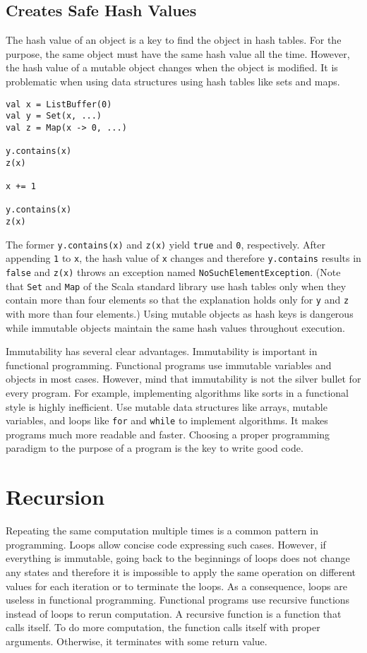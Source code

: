 \subsection{Creates Safe Hash Values}

The hash value of an object is a key to find the object in hash tables. For the
purpose, the same object must have the same hash value all the time. However, the
hash value of a mutable object changes when the object is modified. It is
problematic when using data structures using hash tables like sets and maps.

\begin{verbatim}
val x = ListBuffer(0)
val y = Set(x, ...)
val z = Map(x -> 0, ...)

y.contains(x)
z(x)

x += 1

y.contains(x)
z(x)
\end{verbatim}

The former \verb!y.contains(x)! and \verb!z(x)! yield \verb!true! and \verb!0!,
respectively. After appending \verb!1! to \verb!x!, the hash value of \verb!x!
changes and therefore \verb!y.contains! results in \verb!false! and \verb!z(x)!
throws an exception named \verb!NoSuchElementException!. (Note that \verb!Set!
and \verb!Map! of the Scala standard library use hash tables only when they
contain more than four elements so that the explanation holds only for \verb!y!
and \verb!z! with more than four elements.) Using mutable objects as hash keys is
dangerous while immutable objects maintain the same hash values throughout
execution.

Immutability has several clear advantages. Immutability is important in
functional programming. Functional programs use immutable variables and objects
in most cases. However, mind that immutability is not the silver bullet for every
program. For example, implementing algorithms like sorts in a functional style is
highly inefficient. Use mutable data structures like arrays, mutable variables,
and loops like \verb!for! and \verb!while! to implement algorithms. It makes
programs much more readable and faster. Choosing a proper programming paradigm to
the purpose of a program is the key to write good code.

\section{Recursion}

Repeating the same computation multiple times is a common pattern in programming.
Loops allow concise code expressing such cases. However, if everything is
immutable, going back to the beginnings of loops does not change any states and
therefore it is impossible to apply the same operation on different values for
each iteration or to terminate the loops. As a consequence, loops are useless in
functional programming. Functional programs use recursive functions instead of
loops to rerun computation. A recursive function is a function that calls itself.
To do more computation, the function calls itself with proper arguments.
Otherwise, it terminates with some return value.

